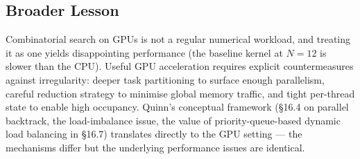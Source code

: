 \documentclass[12pt, letterpaper]{article}
\begin{document}
\subsection{Broader Lesson}

Combinatorial search on GPUs is not a regular numerical workload, and treating it as one yields disappointing performance (the baseline kernel at $N = 12$ is slower than the CPU). Useful GPU acceleration requires explicit countermeasures against irregularity: deeper task partitioning to surface enough parallelism, careful reduction strategy to minimise global memory traffic, and tight per-thread state to enable high occupancy. Quinn's conceptual framework (\S 16.4 on parallel backtrack, the load-imbalance issue, the value of priority-queue-based dynamic load balancing in \S 16.7) translates directly to the GPU setting --- the mechanisms differ but the underlying performance issues are identical.

\newpage
\printbibliography
\end{document}

